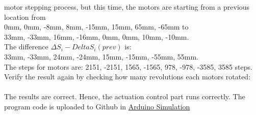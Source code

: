 motor stepping process, but this time, the motors are starting from a previous location from\\0mm, 0mm, -8mm, 
8mm, -15mm, 15mm, 65mm, -65mm to\\33mm, -33mm, 16mm, -16mm, 0mm, 0mm, 10mm, -10mm.\\
The difference $\Delta S_i - Delta S_i(prev)$ is: \\
33mm, -33mm, 24mm, -24mm, 15mm, -15mm, -55mm, 55mm.\\
The steps for motors are: 2151, -2151, 1565, -1565, 978, -978, -3585, 3585 steps.\\
Verify the result again by checking how many revolutions each motors rotated:\\
\\
The results are correct. Hence, the actuation control part runs correctly.
The program code is uploaded to Github in \href{https://github.com/yezehao/Compact-Continuum-Manipulator-Platform/tree/main/Arduino-Simulation}{Arduino Simulation} 





\newpage